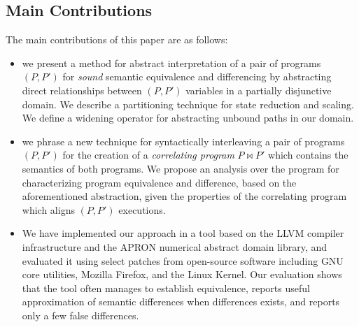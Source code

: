 \subsection{Main Contributions}
The main contributions of this paper are as follows:
\begin{itemize}
\item we present a method for abstract interpretation of a pair of programs $(P,P')$ for \emph{sound} semantic equivalence and differencing by abstracting direct relationships between $(P,P')$ variables in a partially disjunctive domain. We describe a partitioning technique for state reduction and scaling. We define a widening operator for abstracting unbound paths in our domain.
\item we phrase a new technique for syntactically interleaving a pair of programs $(P,P')$ for the creation of a \emph{correlating program} $P \bowtie P'$ which contains the semantics of both programs. We propose an analysis over the program for characterizing program equivalence and difference, based on the aforementioned abstraction, given the properties of the correlating program which aligns $(P,P')$ executions.
\item We have implemented our approach in a tool based on the LLVM compiler infrastructure and the APRON numerical abstract
    domain library, and evaluated it using select patches from open-source software including GNU core utilities, Mozilla
    Firefox, and the Linux Kernel. Our evaluation shows that the tool often manages to establish equivalence, reports useful
    approximation of semantic differences when differences exists, and reports only a few false differences.
\end{itemize}


